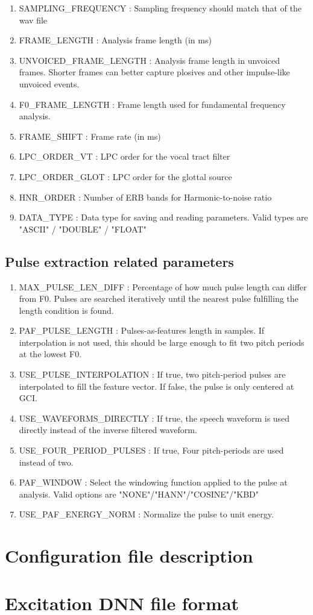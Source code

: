 \documentclass[a4paper, 11pt]{article}
\begin{document}
\begin{enumerate}
    \item[]  SAMPLING\_FREQUENCY : 
    Sampling frequency should match that of the wav file
    \item[]  FRAME\_LENGTH :
    Analysis frame length (in ms)
    \item[]   UNVOICED\_FRAME\_LENGTH :
    Analysis frame length in unvoiced frames. Shorter frames can better capture plosives and other impulse-like unvoiced events.
    \item[] F0\_FRAME\_LENGTH : Frame length used for fundamental frequency analysis. 
    \item[] FRAME\_SHIFT :
    Frame rate (in ms)
    \item[] LPC\_ORDER\_VT : 
    LPC order for the vocal tract filter
    \item[] LPC\_ORDER\_GLOT :
    LPC order for the glottal source
    \item[] HNR\_ORDER :
    Number of ERB bands for Harmonic-to-noise ratio
    \item[] DATA\_TYPE : Data type for saving and reading parameters. Valid types are "ASCII" / "DOUBLE" / "FLOAT"    
\end{enumerate}

\subsection{Pulse extraction related parameters}

\begin{enumerate}
    \item[]                                        
    MAX\_PULSE\_LEN\_DIFF :
    Percentage of how much pulse length can differ from F0. Pulses are searched iteratively until the nearest pulse fulfilling the length condition is found.     
    \item[]
    PAF\_PULSE\_LENGTH :
    Pulses-as-features length in samples. If interpolation is not used, this should be large enough to fit two pitch periods at the lowest F0.
    \item[] 
    USE\_PULSE\_INTERPOLATION :
    If true, two pitch-period pulses are interpolated to fill the feature vector. If false, the pulse is only centered at GCI.
    \item[] 
    USE\_WAVEFORMS\_DIRECTLY :
    If true, the speech waveform is used directly instead of the inverse filtered waveform.
    \item[]
    USE\_FOUR\_PERIOD\_PULSES :
    If true, Four pitch-periods are used instead of two.
    \item[] PAF\_WINDOW :
    Select the windowing function applied to the pulse at analysis. Valid options are 
    "NONE"/"HANN"/"COSINE"/"KBD"
    \item[]
    USE\_PAF\_ENERGY\_NORM :
    Normalize the pulse to unit energy.
\end{enumerate}


\newpage

\begin{appendices}
\section{Configuration file description}
\section{Excitation DNN file format}
\end{appendices}
\end{document}
